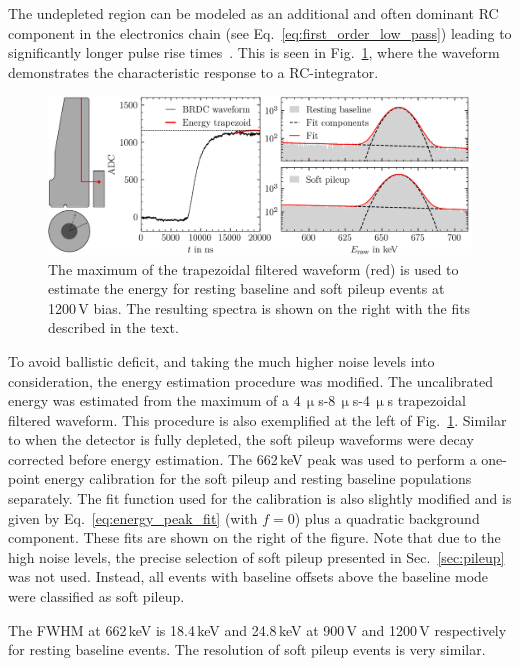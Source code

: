 The undepleted region can be modeled as an additional and often dominant RC component in the electronics chain (see Eq.~\ref{eq:first_order_low_pass}) leading to significantly longer pulse rise times~\cite{cv_impurities}. This is seen in Fig.~\ref{fig:Cs_energy_calculation_1200V}, where the waveform demonstrates the characteristic response to a RC-integrator.  
\begin{figure}[htb]
    \centering
    \includegraphics[width=6in]{figs/bubbles/Cs_energy_calculation_1200V.png}
    \caption{The maximum of the trapezoidal filtered waveform (red) is used to estimate the energy for resting baseline and soft pileup events at 1200\,V bias. The resulting spectra is shown on the right with the fits described in the text.}
	\label{fig:Cs_energy_calculation_1200V}
\end{figure}

To avoid ballistic deficit, and taking the much higher noise levels into consideration, the energy estimation procedure was modified. The uncalibrated energy was estimated from the maximum of a 4\,$\upmu$s-8\,$\upmu$s-4\,$\upmu$s trapezoidal filtered waveform. This procedure is also exemplified at the left of Fig.~\ref{fig:Cs_energy_calculation_1200V}. Similar to when the detector is fully depleted, the soft pileup waveforms were decay corrected before energy estimation. The \CsS{} 662\,keV peak was used to perform a one-point energy calibration for the soft pileup and resting baseline populations separately. The fit function used for the calibration is also slightly modified and is given by Eq.~\ref{eq:energy_peak_fit} (with $f = 0$) plus a quadratic background component. These fits are shown on the right of the figure. Note that due to the high noise levels, the precise selection of soft pileup presented in Sec.~\ref{sec:pileup} was not used. Instead, all events with baseline offsets above the baseline mode were classified as soft pileup. 

The FWHM at 662\,keV is 18.4\,keV and 24.8\,keV at 900\,V and 1200\,V respectively for resting baseline events. The resolution of soft pileup events is very similar.

